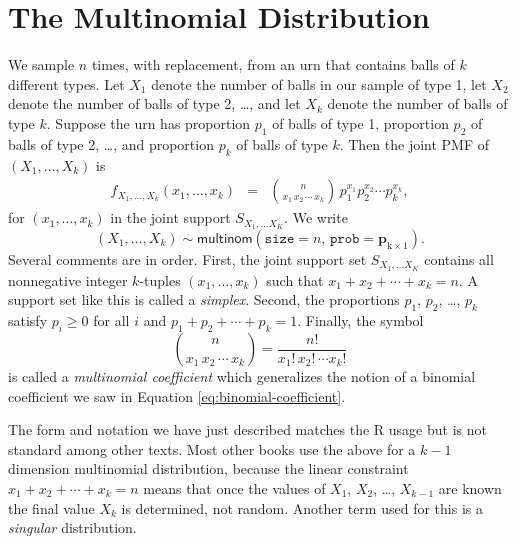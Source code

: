 \documentclass[captions=tableheading]{scrbook}
\begin{document}
\section{The Multinomial Distribution}
\label{sec-7-9}

\label{sec:Multinomial}

We sample \(n\) times, with replacement, from an urn that contains balls of \(k\) different types. Let \(X_{1}\) denote the number of balls in our sample of type 1, let \(X_{2}\) denote the number of balls of type 2, \ldots{}, and let \(X_{k}\) denote the number of balls of type \(k\). Suppose the urn has proportion \(p_{1}\) of balls of type 1, proportion \(p_{2}\) of balls of type 2, \ldots{}, and proportion \(p_{k}\) of balls of type \(k\). Then the joint PMF of \((X_{1},\ldots,X_{k})\) is
\begin{eqnarray}
f_{X_{1},\ldots,X_{k}}(x_{1},\ldots,x_{k}) & = & {n \choose x_{1}\, x_{2}\,\cdots\, x_{k}}\, p_{1}^{x_{1}}p_{2}^{x_{2}}\cdots p_{k}^{x_{k}},
\end{eqnarray}
for \((x_{1},\ldots,x_{k})\) in the joint support \(S_{X_{1},\ldots X_{K}}\). We write
\begin{equation}
(X_{1},\ldots,X_{k})\sim\mathsf{multinom}(\mathtt{size}=n,\,\mathtt{prob}=\mathbf{p}_{\mathrm{k}\times1}).
\end{equation}
Several comments are in order. First, the joint support set \(S_{X_{1},\ldots X_{K}}\) contains all nonnegative integer \(k\)-tuples \((x_{1},\ldots,x_{k})\) such that \(x_{1}+x_{2}+\cdots+x_{k}=n\). A support set like this is called a \emph{simplex}. Second, the proportions \(p_{1}\), \(p_{2}\), \ldots{}, \(p_{k}\) satisfy \(p_{i}\geq0\) for all \(i\) and \(p_{1}+p_{2}+\cdots+p_{k}=1\). Finally, the symbol
\begin{equation}
{n \choose x_{1}\, x_{2}\,\cdots\, x_{k}}=\frac{n!}{x_{1}!\, x_{2}!\,\cdots x_{k}!}
\end{equation}
is called a \emph{multinomial coefficient} which generalizes the notion of a binomial coefficient we saw in Equation \ref{eq:binomial-coefficient}. 

The form and notation we have just described matches the \textsf{R} usage but is not standard among other texts. Most other books use the above for a \(k-1\) dimension multinomial distribution, because the linear constraint \(x_{1}+x_{2}+\cdots+x_{k}=n\) means that once the values of \(X_{1}\), \(X_{2}\), \ldots{}, \(X_{k-1}\) are known the final value \(X_{k}\) is determined, not random. Another term used for this is a \emph{singular} distribution. 
\end{document}
